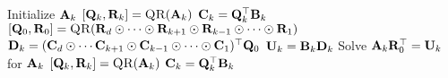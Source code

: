 
\begin{algorithmic}[1]
        \State Initialize $\mathbf{A}_k$
        \State $[\mat{Q}_k,\mat{R}_k] = \Call{QR}{\mat{A}_k}$ 
        \State $\mathbf{C}_k = \mathbf{Q}_k^\top\mathbf{B}_k$  \label{l:EXP-K-Apply} 
      \EndFor
          \State $[\mat{Q}_0,\mat{R}_0] = \Call{QR}{\mat{R}_d \odot \cdots \odot \mat{R}_{k+1} \odot \mat{R}_{k-1} \odot \cdots \odot \mat{R}_1}$  \label{l:cp-round-als-exp-qr}
          \State $\mathbf{D}_k = (\mathbf{C}_d \odot \cdots \mathbf{C}_{k+1} \odot \mathbf{C}_{k-1} \odot \cdots \odot \mathbf{C}_1)^\top\mathbf{Q}_0$  \label{l:EXP-mttkrp}
          \State $\mathbf{U}_k = \mathbf{B}_k\mathbf{D}_k$  \label{l:exp-finish-rhs}
          \State Solve $\mathbf{A}_k\mathbf{R}_0^\top = \mathbf{U}_k$ for $\mathbf{A}_k$  \label{l:cp-round-qr-solve}
          \State $[\mat{Q}_k,\mat{R}_k] = \Call{QR}{\mat{A}_k}$  \label{l:cp-round-qr-updateqr}
          \State $\mathbf{C}_k = \mathbf{Q}_k^\top\mathbf{B}_k$  \label{l:EXP-K-update-cross}   
        \EndFor
      \EndWhile
    \EndFunction
  \end{algorithmic}